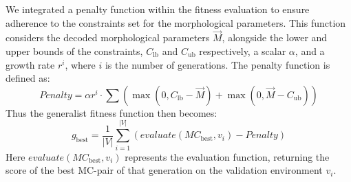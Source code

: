     We integrated a penalty function within the fitness evaluation to ensure adherence to the constraints set for the morphological parameters. This function considers the decoded morphological parameters $\overrightarrow{M}$, alongside the lower and upper bounds of the constraints, $C_\text{lb}$ and $C_\text{ub}$ respectively, a scalar $\alpha$, and a growth rate $r^i$, where $i$ is the number of generations. The penalty function is defined as:
    \begin{equation}
        Penalty = \alpha r^i \cdot \sum(
            \max(0, C_\text{lb} - \overrightarrow{M}) + 
            \max(0, \overrightarrow{M} - C_\text{ub})
        )
    \end{equation}
    Thus the generalist fitness function then becomes:
    \begin{equation}
        g_{\text{best}} = \frac{1}{|V|} \sum_{i=1}^{|V|}(
            evaluate(MC_{\text{best}}, v_i) - Penalty
        ) 
    \end{equation}
    Here $evaluate(MC_{\text{best}}, v_i)$ represents the evaluation function, returning the score of the best MC-pair of that generation on the validation environment $v_i$.